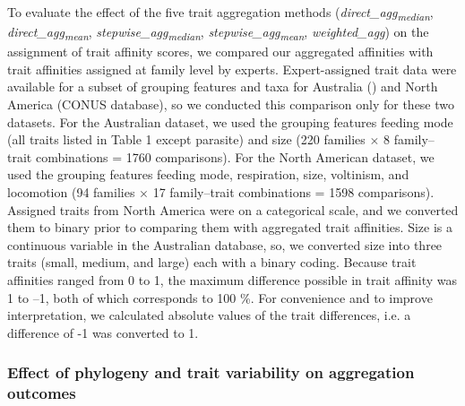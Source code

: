 \documentclass[12pt]{article}
\begin{document}
To evaluate the effect of the five trait aggregation methods
(\textit{direct\_agg\textsubscript{median}}, \textit{direct\_agg\textsubscript{mean}}, \textit{stepwise\_agg\textsubscript{median}}, \textit{stepwise\_agg\textsubscript{mean}}, \textit{weighted\_agg}) on the assignment of trait affinity scores, we compared our aggregated affinities with trait affinities assigned at family level by experts. Expert-assigned trait data were available for a subset of grouping features and taxa for Australia (\cite{chessman_dissolved-oxygen_2018}) and North America (CONUS database), so we conducted this comparison only for these two datasets. For the Australian dataset, we used the grouping features feeding mode (all traits listed in Table 1 except parasite) and size (220 families $\times$ 8 family–trait combinations = 1760 comparisons). For the North American dataset, we used the grouping features feeding mode, respiration, size, voltinism, and locomotion (94 families $\times$ 17 family–trait combinations = 1598 comparisons). Assigned traits from North America were on a categorical scale, and we converted them to binary prior to comparing them with aggregated trait affinities. Size is a continuous variable in the Australian database, so, we converted size into three traits (small, medium, and large) each with a binary coding. Because trait affinities ranged from 0 to 1, the maximum difference possible in trait affinity was 1 to –1, both of which corresponds to 100 \%. For convenience and to improve interpretation, we calculated absolute values of the trait differences, i.e. a difference of -1 was converted to 1.

\newpage

\subsubsection*{Effect of phylogeny and trait variability on aggregation outcomes}
\end{document}
